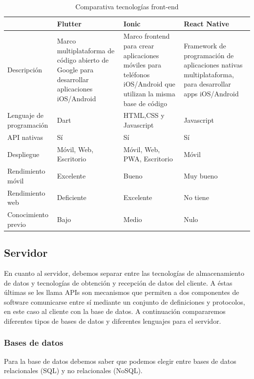 \begin{table}[H] %
    \centering
    \hspace*{-1.7cm}
    \begin{tabular}{|p{2cm} |p{4 cm} |p{4cm} |p{4cm} |} \hline 
         &  \textbf{Flutter}&  \textbf{Ionic}& \textbf{React Native}\\  \hline 
         Descripción &  Marco multiplataforma de código abierto de Google para desarrollar aplicaciones iOS/Android &  Marco frontend para crear aplicaciones móviles para teléfonos iOS/Android que utilizan la misma base de código& Framework de programación de aplicaciones nativas multiplataforma, para desarrollar apps iOS/Android\\ \hline 
         
        Lenguaje de programación &  Dart&  HTML,CSS y Javascript & Javascript\\ \hline 
        API nativas &  Sí&  Sí & Sí\\ \hline 
        Despliegue &  Móvil, Web, Escritorio&  Móvil, Web, PWA, Escritorio & Móvil\\ \hline 
        Rendimiento móvil &  Excelente &  Bueno & Muy bueno\\ \hline 
        Rendimiento web &  Deficiente &  Excelente & No tiene\\ \hline 
        Conocimiento previo & Bajo & Medio & Nulo \\ \hline
    \end{tabular}
    \caption{Comparativa tecnologías front-end \cite{flut-ion} \cite{flut-react}}
    \label{tab:tec_front}
\end{table}

\subsection{Servidor}

En cuanto al servidor, debemos separar entre las tecnologías de almacenamiento de datos y tecnologías de obtención y recepción de datos del cliente. A éstas últimas se les llama APIs \cite{api} son mecanismos que permiten a dos componentes de software comunicarse entre sí mediante un conjunto de definiciones y protocolos, en este caso al cliente con la base de datos. A continuación compararemos diferentes tipos de bases de datos y diferentes lenguajes para el servidor.

\subsubsection{Bases de datos}
Para la base de datos debemos saber que podemos elegir entre bases de datos relacionales (SQL) y no relacionales (NoSQL).

